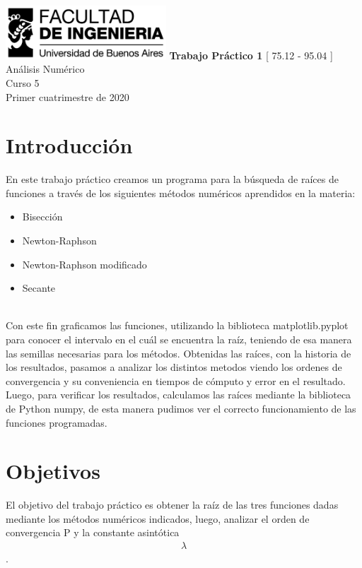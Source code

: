 \documentclass[titlepage,a4paper]{article}
\begin{document}
\begin{titlepage} %
	\hfill\includegraphics[width=6cm]{logofiuba.jpg}
    \centering
    \vfill
    \Huge \textbf{Trabajo Práctico 1}
    \vskip2cm
    \Large [ 75.12 - 95.04 ] Análisis Numérico\\
    Curso 5 \\ 
    Primer cuatrimestre de 2020 
    \vfill
    \vfill
    \vfill
\end{titlepage}

\tableofcontents %

\section{Introducción}\label{sec:intro}
En este trabajo práctico creamos un programa para la búsqueda de raíces de funciones a través de los siguientes métodos numéricos aprendidos en la materia:
\begin{itemize}
\item Bisección
\item Newton-Raphson
\item Newton-Raphson modificado
\item Secante
\end{itemize}
\\Con este fin graficamos las funciones, utilizando la biblioteca matplotlib.pyplot para conocer el intervalo en el cuál se encuentra la raíz, teniendo de esa manera las semillas necesarias para los métodos. Obtenidas las raíces, con la historia de los resultados, pasamos a analizar los distintos metodos viendo los ordenes de convergencia y su conveniencia en tiempos de cómputo y error en el resultado.
Luego, para verificar los resultados, calculamos las raíces mediante la biblioteca de Python numpy, de esta manera pudimos ver el correcto funcionamiento de las funciones programadas.

\section{Objetivos}\label{sec:objetivos}
El objetivo del trabajo práctico es obtener la raíz de las tres funciones dadas mediante los métodos numéricos indicados, luego, analizar el orden de convergencia P y la constante asintótica \begin{align}
\lambda
\end{align}. 
\end{document}
